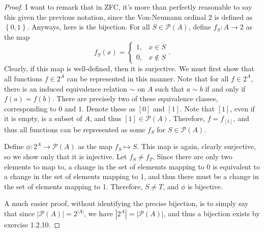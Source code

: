 \documentclass[11pt]{report}
\begin{document}
\begin{proof}
	I want to remark that in ZFC, it's more than perfectly reasonable to say this given the previous notation, since the Von-Neumann ordinal $2$ is defined as $\left\{ 0,1 \right\} $. Anyways, here is the bijection. For all $S\in \mathscr{P} (A)$, define $f_S : A \to 2$ as the map
	\[
		f_S(x)=
		\begin{cases}
			1,&x\in S\\
			0,&x\notin S
		\end{cases}
	.\]
	Clearly, if this map is well-defined, then it is surjective. We must first show that all functions $f\in 2^A$ can be represented in this manner. Note that for all $f\in 2^A$, there is an induced equivalence relation $\sim $ on $A$ such that $a\sim b$ if and only if $f(a)=f(b)$. There are precisely two of these equivalence classes, corresponding to $0$ and $1$. Denote these as $[0]$ and $[1]$. Note that $[1]$, even if it is empty, is a subset of $A$, and thus $[1]\in \mathscr{P} (A)$. Therefore, $f=f_{[1]}$, and thus all functions can be represented as some $f_S$ for $S\in \mathscr{P} (A)$.

	Define $\phi : 2^A \to \mathscr{P} (A)$ as the map $f_S \mapsto S $. This map is again, clearly surjective, so we show only that it is injective. Let $f_S\neq f_T$. Since there are only two elements to map to, a change in the set of elememts mapping to 0 is equivalent to a change in the set of elements mapping to 1, and thus there must be a change in the set of elements mapping to 1. Therefore, $S\neq T$, and $\phi $ is bijective.

	A much easier proof, without identifying the precise bijection, is to simply say that since $\left| \mathscr{P} (A) \right| =2^{\left| A \right| }$, we have $\left| 2^A \right| =\left| \mathscr{P} (A) \right| $, and thus a bijection exists by exercise 1.2.10.
\end{proof}
\end{document}
